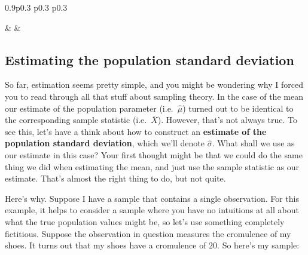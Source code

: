 \documentclass[
  a4paper,
]{book}
\begin{document}
\begin{table}[ht]
\begin{centerbox}
\begin{threeparttable}
\begin{tabularx}{0.9\textwidth}{p{} p{} p{}}
\hhline{}

 &
 &
 \tabularnewline[-0.5pt]


\end{tabularx} 

\end{threeparttable}\par\end{centerbox}

\end{table}
 

\hypertarget{estimating-the-population-standard-deviation}{%
\subsection{Estimating the population standard
deviation}\label{estimating-the-population-standard-deviation}}

So far, estimation seems pretty simple, and you might be wondering why I
forced you to read through all that stuff about sampling theory. In the
case of the mean our estimate of the population parameter
(i.e.~\(\hat{\mu}\)) turned out to be identical to the corresponding
sample statistic (i.e.~\(\bar{X}\)). However, that's not always true. To
see this, let's have a think about how to construct an \textbf{estimate
of the population standard deviation}, which we'll denote
\(\hat{\sigma}\). What shall we use as our estimate in this case? Your
first thought might be that we could do the same thing we did when
estimating the mean, and just use the sample statistic as our estimate.
That's almost the right thing to do, but not quite.

Here's why. Suppose I have a sample that contains a single observation.
For this example, it helps to consider a sample where you have no
intuitions at all about what the true population values might be, so
let's use something completely fictitious. Suppose the observation in
question measures the cromulence of my shoes. It turns out that my shoes
have a cromulence of \(20\). So here's my sample:
\end{document}
